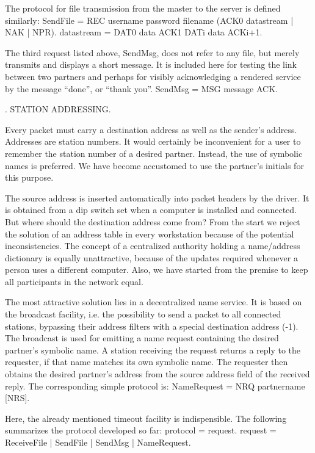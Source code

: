 \noindent The protocol for file transmission from the master to the server is defined similarly:
\begintt
SendFile = REC username password filename (ACK0 datastream | NAK | NPR).
datastream = DAT0 data ACK1 {DATi data ACKi+1}.
\endtt

\noindent The third request listed above, SendMsg, does not refer to any file, but merely transmits and displays a short message. It is included here for testing the link between two partners and perhaps for visibly acknowledging a rendered service by the message ``done'', or ``thank you''.
\begintt
SendMsg = MSG message ACK.
\endtt

. STATION ADDRESSING.

Every packet must carry a destination address as well as the sender's address. Addresses are station numbers. It would certainly be inconvenient for a user to remember the station number of a desired partner. Instead, the use of symbolic names is preferred. We have become accustomed to use the partner's initials for this purpose.

The source address is inserted automatically into packet headers by the driver. It is obtained from a dip switch set when a computer is installed and connected. But where should the destination address come from? From the start we reject the solution of an address table in every workstation because of the potential inconsistencies. The concept of a centralized authority holding a name/address dictionary is equally unattractive, because of the updates required whenever a person uses a different computer. Also, we have started from the premise to keep all participants in the network equal.

The most attractive solution lies in a decentralized name service. It is based on the broadcast facility, i.e. the possibility to send a packet to all connected stations, bypassing their address filters with a special destination address (-1). The broadcast is used for emitting a name request containing the desired partner's symbolic name. A station receiving the request returns a reply to the requester, if that name matches its own symbolic name. The requester then obtains the desired partner's address from the source address field of the received reply. The corresponding simple protocol is:
\begintt
NameRequest = NRQ partnername [NRS].
\endtt

\noindent Here, the already mentioned timeout facility is indispensible. The following summarizes the protocol developed so far:
\begintt
protocol = {request}.
request = ReceiveFile | SendFile | SendMsg | NameRequest.
\endtt

